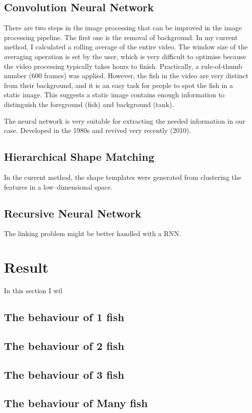 \documentclass[11pt,twoside]{report}
\begin{document}
\subsection{Convolution Neural Network}
\label{section:cnn}

There are two steps in the image processing that can be improved in the image processing pipeline. The first one is the removal of background. In my current method, I calculated a rolling average of the entire video. The window size of the averaging operation is set by the user, which is very difficult to optimise because the video processing typically takes hours to finish. Practically, a rule-of-thumb number (600 frames) was applied. However, the fish in the video are very distinct from their background, and it is an easy task for people to spot the fish in a static image. This suggests a static image contains enough information to distinguish the foreground (fish) and background (tank). 

The neural network is very suitable for extracting the needed information in our case. Developed in the 1980s and revived very recently (2010).

\subsection{Hierarchical Shape Matching}
\label{section:hierarchical_shape}

In the current method, the shape templates were generated from clustering the features in a low--dimensional space.

\subsection{Recursive Neural Network}
\label{section:rnn}

The linking problem might be better handled with a RNN.

\section{Result}

In this section I wil

\subsection{The behaviour of 1 fish}
\label{section:fish_1_2d}

\subsection{The behaviour of 2 fish}
\label{section:fish_2_2d}

\subsection{The behaviour of 3 fish}
\label{section:fish_3_2d}

\subsection{The behaviour of Many fish}
\label{section:fish_many_2d}
\end{document}
